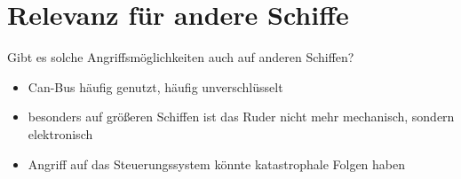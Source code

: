 \section{Relevanz für andere Schiffe}
Gibt es solche Angriffsmöglichkeiten auch auf anderen Schiffen?
\begin{itemize}
    \item Can-Bus häufig genutzt, häufig unverschlüsselt
    \item besonders auf größeren Schiffen ist das Ruder nicht mehr mechanisch, sondern elektronisch
    \item Angriff auf das Steuerungssystem könnte katastrophale Folgen haben
\end{itemize}